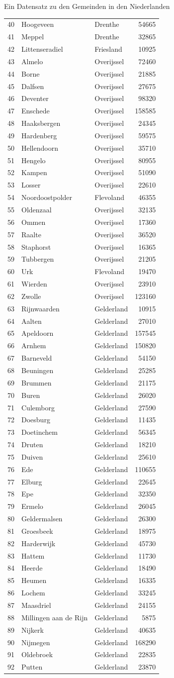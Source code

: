 \documentclass[ignorenonframetext,]{beamer}
\begin{document}
\begin{frame}[fragile]{Ein Datensatz zu den Gemeinden in den
Niederlanden}
\begin{longtable}[]{@{}lllr@{}}
40 & Hoogeveen & Drenthe & 54665\tabularnewline
41 & Meppel & Drenthe & 32865\tabularnewline
42 & Littenseradiel & Friesland & 10925\tabularnewline
43 & Almelo & Overijssel & 72460\tabularnewline
44 & Borne & Overijssel & 21885\tabularnewline
45 & Dalfsen & Overijssel & 27675\tabularnewline
46 & Deventer & Overijssel & 98320\tabularnewline
47 & Enschede & Overijssel & 158585\tabularnewline
48 & Haaksbergen & Overijssel & 24345\tabularnewline
49 & Hardenberg & Overijssel & 59575\tabularnewline
50 & Hellendoorn & Overijssel & 35710\tabularnewline
51 & Hengelo & Overijssel & 80955\tabularnewline
52 & Kampen & Overijssel & 51090\tabularnewline
53 & Losser & Overijssel & 22610\tabularnewline
54 & Noordoostpolder & Flevoland & 46355\tabularnewline
55 & Oldenzaal & Overijssel & 32135\tabularnewline
56 & Ommen & Overijssel & 17360\tabularnewline
57 & Raalte & Overijssel & 36520\tabularnewline
58 & Staphorst & Overijssel & 16365\tabularnewline
59 & Tubbergen & Overijssel & 21205\tabularnewline
60 & Urk & Flevoland & 19470\tabularnewline
61 & Wierden & Overijssel & 23910\tabularnewline
62 & Zwolle & Overijssel & 123160\tabularnewline
63 & Rijnwaarden & Gelderland & 10915\tabularnewline
64 & Aalten & Gelderland & 27010\tabularnewline
65 & Apeldoorn & Gelderland & 157545\tabularnewline
66 & Arnhem & Gelderland & 150820\tabularnewline
67 & Barneveld & Gelderland & 54150\tabularnewline
68 & Beuningen & Gelderland & 25285\tabularnewline
69 & Brummen & Gelderland & 21175\tabularnewline
70 & Buren & Gelderland & 26020\tabularnewline
71 & Culemborg & Gelderland & 27590\tabularnewline
72 & Doesburg & Gelderland & 11435\tabularnewline
73 & Doetinchem & Gelderland & 56345\tabularnewline
74 & Druten & Gelderland & 18210\tabularnewline
75 & Duiven & Gelderland & 25610\tabularnewline
76 & Ede & Gelderland & 110655\tabularnewline
77 & Elburg & Gelderland & 22645\tabularnewline
78 & Epe & Gelderland & 32350\tabularnewline
79 & Ermelo & Gelderland & 26045\tabularnewline
80 & Geldermalsen & Gelderland & 26300\tabularnewline
81 & Groesbeek & Gelderland & 18975\tabularnewline
82 & Harderwijk & Gelderland & 45730\tabularnewline
83 & Hattem & Gelderland & 11730\tabularnewline
84 & Heerde & Gelderland & 18490\tabularnewline
85 & Heumen & Gelderland & 16335\tabularnewline
86 & Lochem & Gelderland & 33245\tabularnewline
87 & Maasdriel & Gelderland & 24155\tabularnewline
88 & Millingen aan de Rijn & Gelderland & 5875\tabularnewline
89 & Nijkerk & Gelderland & 40635\tabularnewline
90 & Nijmegen & Gelderland & 168290\tabularnewline
91 & Oldebroek & Gelderland & 22835\tabularnewline
92 & Putten & Gelderland & 23870\tabularnewline

\end{longtable}
\end{frame}
\end{document}
